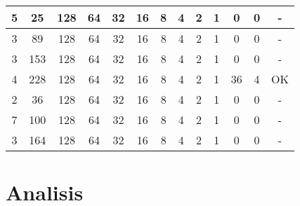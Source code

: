\begin{table}[htbp]
\begin{tabular}{|c|c|c|c|c|c|c|c|c|c|c|c|c|}
		\hline
		5     & 25    & 128   & 64    & 32    & 16    & 8     & 4     & 2     & 1     & 0     & 0     & - \bigstrut\\
		\hline
		3     & 89    & 128   & 64    & 32    & 16    & 8     & 4     & 2     & 1     & 0     & 0     & - \bigstrut\\
		\hline
		3     & 153   & 128   & 64    & 32    & 16    & 8     & 4     & 2     & 1     & 0     & 0     & - \bigstrut\\
		\hline
		4     & 228   & 128   & 64    & 32    & 16    & 8     & 4     & 2     & 1     & 36    & 4     & OK \bigstrut\\
		\hline
		2     & 36    & 128   & 64    & 32    & 16    & 8     & 4     & 2     & 1     & 0     & 0     & - \bigstrut\\
		\hline
		7     & 100   & 128   & 64    & 32    & 16    & 8     & 4     & 2     & 1     & 0     & 0     & - \bigstrut\\
		\hline
		3     & 164   & 128   & 64    & 32    & 16    & 8     & 4     & 2     & 1     & 0     & 0     & - \bigstrut\\
		\hline
	\end{tabular}%
	\label{tab:addladbel}%
\end{table}%





\section{Analisis}
